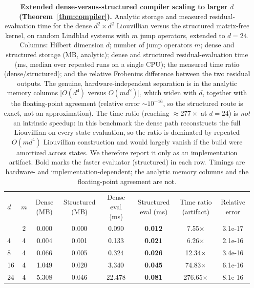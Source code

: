 \documentclass[twocolumn,aps,prxquantum,superscriptaddress,nofootinbib,floatfix,longbibliography]{revtex4-2}
\begin{document}
\begin{table}[t]
\centering
\caption{\textbf{Extended dense-versus-structured compiler scaling to larger $d$ (Theorem~\ref{thm:compiler}).} Analytic storage and measured residual-evaluation time for the dense $d^2\times d^2$ Liouvillian versus the structured matrix-free kernel, on random Lindblad systems with $m$ jump operators, extended to $d=24$. Columns: Hilbert dimension $d$; number of jump operators $m$; dense and structured storage (MB, analytic); dense and structured residual-evaluation time (ms, median over repeated runs on a single CPU); the measured time ratio (dense/structured); and the relative Frobenius difference between the two residual outputs. The genuine, hardware-independent separation is in the analytic memory columns [$O(d^4)$ versus $O(md^2)$], which widen with $d$, together with the floating-point agreement (relative error $\sim10^{-16}$, so the structured route is exact, not an approximation). The time ratio (reaching $\approx277\times$ at $d=24$) is \emph{not} an intrinsic speedup: in this benchmark the dense path reconstructs the full Liouvillian on every state evaluation, so the ratio is dominated by repeated $O(md^4)$ Liouvillian construction and would largely vanish if the build were amortized across states. We therefore report it only as an implementation artifact. Bold marks the faster evaluator (structured) in each row. Timings are hardware- and implementation-dependent; the analytic memory columns and the floating-point agreement are not.}
\label{tab:compiler_scaling}
\begin{ruledtabular}
\begin{tabular}{lccccccc}
$d$ & $m$ & Dense (MB) & Structured (MB) & Dense eval (ms) & Structured eval (ms) & Time ratio (artifact) & Relative error \\
\colrule
2 & 2 & 0.000 & 0.000 & 0.090 & \textbf{0.012} & 7.55$\times$ & 3.1e-17 \\
4 & 4 & 0.004 & 0.001 & 0.133 & \textbf{0.021} & 6.26$\times$ & 2.1e-16 \\
8 & 4 & 0.066 & 0.005 & 0.324 & \textbf{0.026} & 12.34$\times$ & 3.4e-16 \\
16 & 4 & 1.049 & 0.020 & 3.340 & \textbf{0.045} & 74.83$\times$ & 6.1e-16 \\
24 & 4 & 5.308 & 0.046 & 22.478 & \textbf{0.081} & 276.65$\times$ & 8.1e-16 \\
\end{tabular}
\end{ruledtabular}
\end{table}
\end{document}
